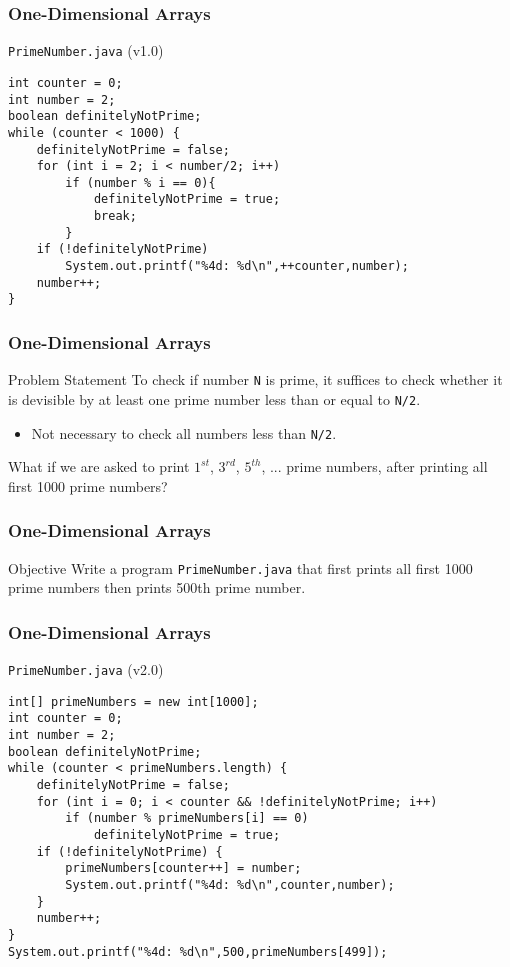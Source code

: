 \documentclass[10pt, compress]{beamer}
\begin{document}
\begin{frame}[fragile]
	\frametitle{One-Dimensional Arrays}
	\begin{block}{\texttt{PrimeNumber.java} (v1.0)}
		\begin{verbatim}
int counter = 0;
int number = 2;
boolean definitelyNotPrime;
while (counter < 1000) {
	definitelyNotPrime = false;
	for (int i = 2; i < number/2; i++)
		if (number % i == 0){
			definitelyNotPrime = true;
			break;
		}
	if (!definitelyNotPrime)
		System.out.printf("%4d: %d\n",++counter,number);
	number++;
}
		\end{verbatim}
	\end{block}
\end{frame}

\begin{frame}[fragile]
	\frametitle{One-Dimensional Arrays}
	\begin{block}{Problem Statement}
		To check if number \texttt{N} is prime, it suffices to check whether it is devisible by at least one prime number less than or equal to \texttt{N/2}.
		\begin{itemize}
			\item[] Not necessary to check all numbers less than \texttt{N/2}.
		\end{itemize}
		What if we are asked to print $1^{st}$, $3^{rd}$, $5^{th}$, ... prime numbers, after printing all first 1000 prime numbers?
	\end{block}
\end{frame}

\begin{frame}[fragile]
	\frametitle{One-Dimensional Arrays}
	\begin{block}{Objective}
		Write a program \texttt{PrimeNumber.java} that first prints all first 1000 prime numbers then prints 500th prime number.
	\end{block}
\end{frame}

\begin{frame}[fragile]
	\frametitle{One-Dimensional Arrays}
	\begin{block}{\texttt{PrimeNumber.java} (v2.0)}
		\begin{verbatim}
int[] primeNumbers = new int[1000];
int counter = 0;
int number = 2;
boolean definitelyNotPrime;
while (counter < primeNumbers.length) {
	definitelyNotPrime = false;
	for (int i = 0; i < counter && !definitelyNotPrime; i++)
		if (number % primeNumbers[i] == 0)
			definitelyNotPrime = true;
	if (!definitelyNotPrime) {
		primeNumbers[counter++] = number;
		System.out.printf("%4d: %d\n",counter,number);
	}
	number++;
}
System.out.printf("%4d: %d\n",500,primeNumbers[499]);
		\end{verbatim}
	\end{block}
\end{frame}
\end{document}
